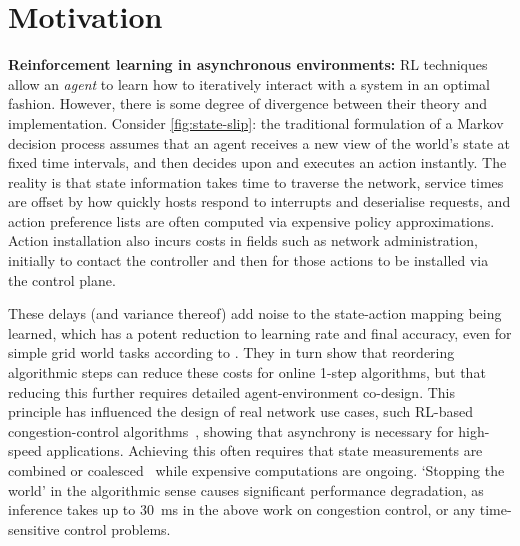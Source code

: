 \documentclass[sigconf,natbib=false]{acmart}
\newcommand{\fakepara}[1]{\noindent\textbf{#1:}}
\begin{document}
\section{Motivation}\label{sec:motivation}
\fakepara{Reinforcement learning in asynchronous environments}
RL techniques allow an \emph{agent} to learn how to iteratively interact with a system in an optimal fashion.
However, there is some degree of divergence between their theory and implementation.
Consider \cref{fig:state-slip}: the traditional formulation of a Markov decision process assumes that an agent receives a new view of the world's state at fixed time intervals, and then decides upon and executes an action instantly.
The reality is that state information takes time to traverse the network, service times are offset by how quickly hosts respond to interrupts and deserialise requests, and action preference lists are often computed via expensive policy approximations.
Action installation also incurs costs in fields such as network administration, initially to contact the controller and then for those actions to be installed via the control plane.

These delays (and variance thereof) add noise to the state-action mapping being learned, which has a potent reduction to learning rate and final accuracy, even for simple grid world tasks according to \textcite{DBLP:journals/firai/TravnikMSP18}.
They in turn show that reordering algorithmic steps can reduce these costs for online 1-step algorithms, but that reducing this further requires detailed agent-environment co-design.
This principle has influenced the design of real network use cases, such RL-based congestion-control algorithms~\parencite{DBLP:journals/corr/abs-1910-04054}, showing that asynchrony is necessary for high-speed applications.
Achieving this often requires that state measurements are combined or coalesced~\parencite{DBLP:journals/corr/abs-1910-04054,DBLP:journals/tnsm/SimpsonRP20} while expensive computations are ongoing.
`Stopping the world' in the algorithmic sense causes significant performance degradation, as inference takes up to \SI{30}{\milli\second} in the above work on congestion control, or any time-sensitive control problems.
\end{document}
